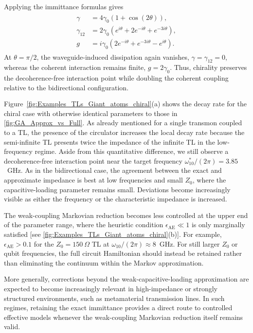 \documentclass[prx,aps,twocolumn,article]{revtex4-2}
\begin{document}
Applying the immittance formulas gives
\begin{align}
\begin{aligned}
    \gamma
    &=
    4\gamma_0
    \left(
        1+\cos(2\theta)
    \right),
    \\
    \gamma_{12}
    &=
    2\gamma_0
    \left(
        e^{i\theta}
        +
        2e^{-i\theta}
        +
        e^{-3i\theta}
    \right),
    \\
    g
    &=
    i\gamma_0
    \left(
        2e^{-i\theta}
        +
        e^{-3i\theta}
        -
        e^{i\theta}
    \right).
\end{aligned}
\end{align}
At $\theta=\pi/2$, the waveguide-induced dissipation again vanishes,
$\gamma=\gamma_{12}=0$, whereas the coherent interaction remains finite,
$g=2\gamma_0$. Thus, chirality preserves the decoherence-free interaction
point while doubling the coherent coupling relative to the bidirectional
configuration.

Figure~\ref{fig:Examples_TLs_Giant_atoms_chiral}(a) shows the decay rate
for the chiral case with otherwise identical parameters to those in
\cref{fig:GA_Approx_vs_Full}. As already mentioned for a single transmon
coupled to a \gls{TL}, the presence of the circulator increases the local
decay rate because the semi-infinite \gls{TL} presents twice the impedance
of the infinite \gls{TL} in the low-frequency regime. Aside from this
quantitative difference, we still observe a decoherence-free interaction
point near the target frequency $\omega_{10}^*/(2\pi)=3.85$~GHz. As in the bidirectional case, the agreement between the exact and approximate impedance is best at low frequencies and small $Z_0$, where the capacitive-loading parameter remains small. Deviations become increasingly visible as either the frequency or the characteristic impedance is increased.

The weak-coupling Markovian reduction becomes less controlled at the upper
end of the parameter range, where the heuristic condition
$\epsilon_{\mathrm{AE}}\ll1$ is only marginally satisfied
[see \cref{fig:Examples_TLs_Giant_atoms_chiral}(b)]. For example,
$\epsilon_{\mathrm{AE}}>0.1$ for the $Z_0=150~\Omega$ \gls{TL} at
$\omega_{10}/(2\pi)\approx8$~GHz. For still larger $Z_0$ or qubit
frequencies, the full circuit Hamiltonian should instead be retained rather
than eliminating the continuum within the Markov approximation.

More generally, corrections beyond the weak-capacitive-loading approximation
are expected to become increasingly relevant in high-impedance or strongly
structured environments, such as metamaterial transmission lines. In such
regimes, retaining the exact immittance provides a direct route to controlled effective models whenever the weak-coupling Markovian reduction itself remains valid.
\end{document}
